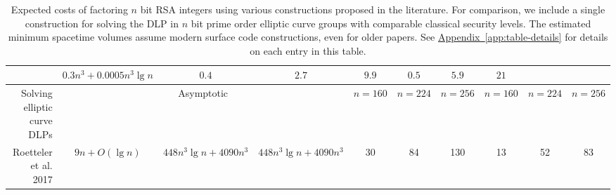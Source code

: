 \documentclass[a4paper, onecolumn, accepted=2021-03-29]{quantumarticle}
\DeclareRobustCommand{\app}[1]{\hyperref[app:#1]{Appendix~\ref*{app:#1}}}
\begin{document}
\begin{table}[p]
{\begin{tabular}{r||c|c|c||c|c|c||c|c|c}
    &{\boldmath $0.3 n^3 + 0.0005 n^3 \lg n$}
        &{\boldmath $0.4$}
        &{\boldmath $2.7$}
        &{\boldmath $9.9$}
            &{\boldmath $0.5$}
            &{\boldmath $5.9$}
            &{\boldmath $21$}
                \\
\hline
Solving elliptic curve DLPs
    &\multicolumn{3}{c||}{Asymptotic}
        &$n=160$ &$n=224$ &$n=256$
            &$n=160$ &$n=224$ &$n=256$
                \\
\hline
Roetteler et al. 2017 \cite{roetteler2017quantum}
    &$9n + O(\lg n)$
    &$448 n^3 \lg n + 4090 n^3$
    &$448 n^3 \lg n + 4090 n^3$
        &30
        &84
        &130
            &13
            &52
            &83
  \end{tabular}
  }
  \caption{
    Expected costs of factoring $n$ bit RSA integers using various constructions proposed in the literature.
    For comparison, we include a single construction for solving the DLP in $n$ bit prime order elliptic curve groups with comparable classical security levels.
    The estimated minimum spacetime volumes assume modern surface code constructions, even for older papers.
    See \app{table-details} for details on each entry in this table.
  }
  \label{tbl:comparison}
\end{table}
\end{document}
